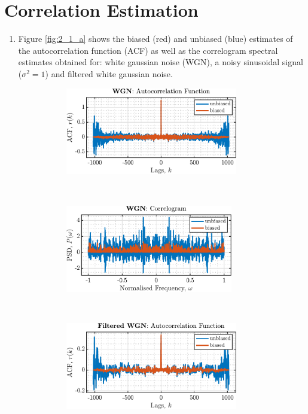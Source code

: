 \section{Correlation Estimation}

\begin{enumerate}[label=\alph*), leftmargin=*]
\item
%

Figure \ref{fig:2_1_a} shows the biased (red) and unbiased (blue) estimates of the autocorrelation function (ACF) as well as the correlogram spectral estimates obtained for:
white gaussian noise (WGN), a noisy sinusoidal signal ($\sigma^{2} = 1$) and filtered white gaussian noise.

\begin{figure}[h]
    \centering
    \begin{subfigure}{0.49\textwidth}
        \centering
        \includegraphics[height=1.5in]{report/parametric-and-line-spectra/correlation-estimation/assets/a/acf-WGN}
    \end{subfigure}
    ~
    \begin{subfigure}{0.49\textwidth}
        \centering
        \includegraphics[height=1.5in]{report/parametric-and-line-spectra/correlation-estimation/assets/a/psd-WGN}
    \end{subfigure}
    ~
    ~
    \begin{subfigure}{0.49\textwidth}
        \centering
        \includegraphics[height=1.5in]{report/parametric-and-line-spectra/correlation-estimation/assets/a/acf-Filtered_WGN}

\end{subfigure}
\end{figure}
\end{enumerate}
